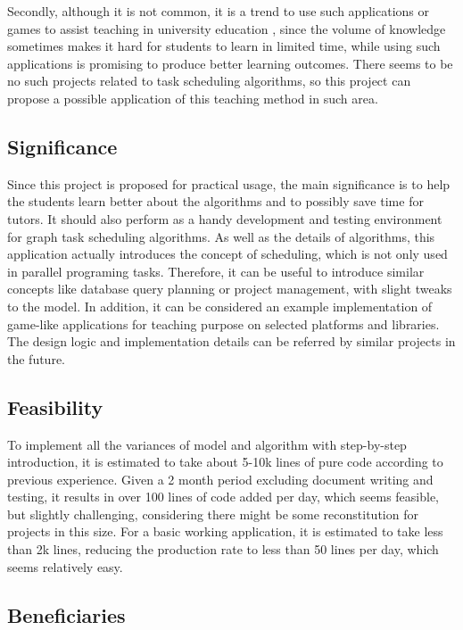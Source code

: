 \documentclass[a4paper,11pt]{article}
\begin{document}
Secondly, although it is not common, it is a trend to use such applications or games to assist teaching in university education \cite{Shabanah2010,Becker2001,Harteveld}, since the volume of knowledge sometimes makes it hard for students to learn in limited time, while using such applications is promising to produce better learning outcomes. There seems to be no such projects related to task scheduling algorithms, so this project can propose a possible application of this teaching method in such area.

\subsection{Significance} \label{sec:sig}

Since this project is proposed for practical usage, the main significance is to help the students learn better about the algorithms and to possibly save time for tutors. It should also perform as a handy development and testing environment for graph task scheduling algorithms. As well as the details of algorithms, this application actually introduces the concept of scheduling, which is not only used in parallel programing tasks. Therefore, it can be useful to introduce similar concepts like database query planning or project management, with slight tweaks to the model. In addition, it can be considered an example implementation of game-like applications for teaching purpose on selected platforms and libraries. The design logic and implementation details can be referred by similar projects in the future.

\subsection{Feasibility}

To implement all the variances of model and algorithm with step-by-step introduction, it is estimated to take about 5-10k lines of pure code according to previous experience. Given a 2 month period excluding document writing and testing, it results in over 100 lines of code added per day, which seems feasible, but slightly challenging, considering there might be some reconstitution for projects in this size. For a basic working application, it is estimated to take less than 2k lines, reducing the production rate to less than 50 lines per day, which seems relatively easy.

\subsection{Beneficiaries}
\end{document}
